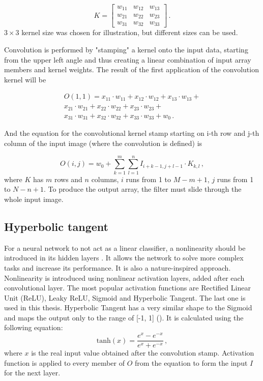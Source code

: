 \begin{equation}
	K = \begin{bmatrix}
    w_{11}       & w_{12} & w_{13} \\
    w_{21}       & w_{22} & w_{23} \\
    w_{31}       & w_{32} & w_{33} 
	\end{bmatrix}\,.
\label{Kernel}
\end{equation}
$3 \times 3$ kernel size was chosen for illustration, but different sizes can be used. 

Convolution is performed by "stamping" a kernel onto the input data, starting from the upper left angle and thus creating a linear combination of input array members and kernel weights. The result of the first application of the convolution kernel will be

\begin{equation}
\begin{aligned}
	O(1, 1) = x_{11}\cdot w_{11} + x_{12}\cdot w_{12} + x_{13}\cdot w_{13} +\\
	x_{21}\cdot w_{21} + x_{22}\cdot w_{22} + x_{23}\cdot w_{23} + \\
	x_{31}\cdot w_{31} + x_{32}\cdot w_{32} + x_{33}\cdot w_{33} + w_0\,.
\end{aligned}
\end{equation}

And the equation for the convolutional kernel stamp starting on i-th row and j-th column of the input image (where the convolution is defined) is

\begin{equation}
	O(i, j) = w_0 + \sum\limits_{k=1}^m \sum\limits_{l=1}^n I_{i+k-1, j+l-1}\cdot K_{k, l} \,,
\label{convol_eq}
\end{equation}
where $K$ has $m$ rows and $n$ columns, $i$ runs from 1 to $M-m+1$, $j$ runs from 1 to $N-n+1$. To produce the output array, the filter must slide through the whole input image.


\subsection{Hyperbolic tangent}

For a neural network to not act as a linear classifier, a nonlinearity should be introduced in its hidden layers \cite{sharma2017activation}. It allows the network to solve more complex tasks and increase its performance. It is also a nature-inspired approach. Nonlinearity is introduced using nonlinear activation layers, added after each convolutional layer. The most popular activation functions are Rectified Linear Unit (ReLU), Leaky ReLU, Sigmoid and Hyperbolic Tangent. The last one is used in this thesis. Hyperbolic Tangent has a very similar shape to the Sigmoid and maps the output only to the range of [-1, 1] (). It is calculated using the following equation:
\begin{equation}
	\textrm{tanh}(x) = \frac{e^x-e^{-x}}{e^x+e^{-x}}\,,
\end{equation}
where $x$ is the real input value obtained after the convolution stamp. Activation function is applied to every member of $O$ from the equation  to form the input $I$ for the next layer.

